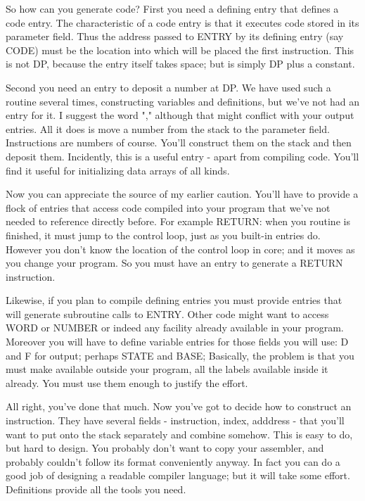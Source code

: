\documentclass[b5paper, oneside]{book}
\begin{document}
So how can you generate code? First you need a defining entry that defines a code entry. The characteristic of a code entry is that it executes code stored in its parameter field. Thus the address passed to ENTRY by its defining entry (say CODE) must be the location into which will be placed the first instruction. This is not DP, because the entry itself takes space; but is simply DP plus a constant.

Second you need an entry to deposit a number at DP. We have used such a routine several times, constructing variables and definitions, but we've not had an entry for it. I suggest the word "," although that might conflict with your output entries. All it does is move a number from the stack to the parameter field. Instructions are numbers of course. You'll construct them on the stack and then deposit them. Incidently, this is a useful entry - apart from compiling code. You'll find it useful for initializing data arrays of all kinds.

Now you can appreciate the source of my earlier caution. You'll have to provide a flock of entries that access code compiled into your program that we've not needed to reference directly before. For example RETURN: when you routine is finished, it must jump to the control loop, just as you built-in entries do. However you don't know the location of the control loop in core; and it moves as you change your program. So you must have an entry to generate a RETURN instruction.

Likewise, if you plan to compile defining entries you must provide entries that will generate subroutine calls to ENTRY. Other code might want to access WORD or NUMBER or indeed any facility already available in your program. Moreover you will have to define variable entries for those fields you will use: D and F for output; perhaps STATE and BASE; Basically, the problem is that you must make available outside your program, all the labels available inside it already. You must use them enough to justify the effort.

All right, you've done that much. Now you've got to decide how to construct an instruction. They have several fields - instruction, index, adddress - that you'll want to put onto the stack separately and combine somehow. This is easy to do, but hard to design. You probably don't want to copy your assembler, and probably couldn't follow its format conveniently anyway. In fact you can do a good job of designing a readable compiler language; but it will take some effort. Definitions provide all the tools you need.
\end{document}
